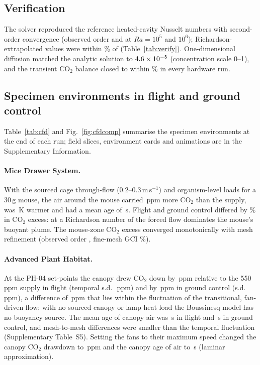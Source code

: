 \documentclass[11pt]{article}
\begin{document}
\subsection{Verification}
The solver reproduced the reference heated-cavity Nusselt numbers with second-order convergence
(observed order \hwVerPRaFive{} and \hwVerPRaSix{} at $Ra=10^5$ and $10^6$); Richardson-extrapolated values
were within \hwVerMaxExtErr\% of \citet{hortmann1990} (Table~\ref{tab:verify}). One-dimensional diffusion
matched the analytic solution to $4.6\times10^{-5}$ (concentration scale 0--1), and the transient CO$_2$
balance closed to within \hwCfdMaxImbalance\% in every hardware run.



\subsection{Specimen environments in flight and ground control}
Table~\ref{tab:cfd} and Fig.~\ref{fig:cfdcomp} summarise the specimen environments at the end of each run;
field slices, environment cards and animations are in the Supplementary Information.

\paragraph{Mice Drawer System.} With the sourced cage through-flow (0.2--0.3\,m\,s$^{-1}$) and organism-level
loads for a 30\,g mouse, the air around the mouse carried \hwCfdMdsZeroCo{}\,ppm more CO$_2$ than the supply,
was \hwCfdMdsZeroDt{}\,K warmer and had a mean age of \hwCfdMdsZeroAge{}\,s. Flight and ground control
differed by \hwCfdMdsGravityDiffPct\% in CO$_2$ excess: at a Richardson number of \hwCfdMdsZeroRi{} the
forced flow dominates the mouse's buoyant plume. The mouse-zone CO$_2$ excess converged monotonically with
mesh refinement (observed order \hwGciPMdsCo{}, fine-mesh GCI \hwGciMdsCo\%).

\paragraph{Advanced Plant Habitat.} At the PH-04 set-points the canopy drew CO$_2$ down by
\hwCfdAphZeroCo{}\,ppm relative to the 550\,ppm supply in flight (temporal s.d.\ \hwCfdAphZeroCoSd{}\,ppm) and by
\hwCfdAphOneCo{}\,ppm in ground control (s.d.\ \hwCfdAphOneCoSd{}\,ppm), a difference of
\hwCfdAphGravityDiff{}\,ppm that lies within the fluctuation of the transitional, fan-driven flow; with no
sourced canopy or lamp heat load the Boussinesq model has no buoyancy source. The mean age of canopy air
was \hwCfdAphZeroAge{}\,s in flight and \hwCfdAphOneAge{}\,s in ground control, and mesh-to-mesh differences
were smaller than the temporal fluctuation (Supplementary Table~S5). Setting the
fans to their maximum speed changed the canopy CO$_2$ drawdown to \hwCfdAphFanmaxZeroCo{}\,ppm and the canopy
age of air to \hwCfdAphFanmaxZeroAge{}\,s (laminar approximation).
\end{document}
